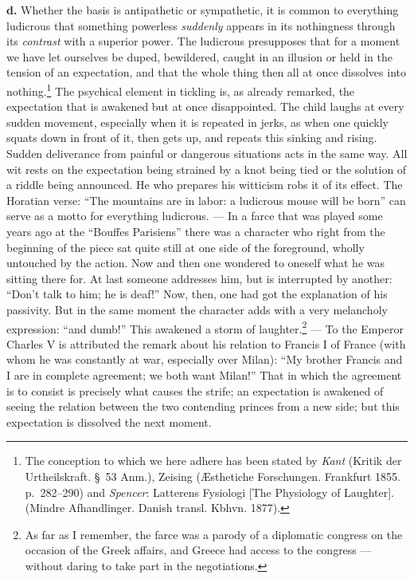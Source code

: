 \documentclass[12pt,a4paper]{book}
\newcommand{\opage}[1]{\marginnote{\footnotesize\textit{[#1]}}}
\begin{document}
\textbf{d.} Whether the basis is antipathetic or sympathetic, it is
common to everything ludicrous that something powerless \emph{suddenly}
appears in its nothingness through its \emph{contrast} with a superior
power. The ludicrous presupposes that for a moment we have let
ourselves be duped, bewildered, caught in an illusion or held in the
tension of an expectation, and that the whole thing then all at
once dissolves into nothing.\footnote{The conception to which we here
adhere has been stated by \emph{Kant} (Kritik der Urtheilskraft. \S~53
Anm.), Zeising (Æsthetiche Forschungen. Frankfurt 1855. p.~282--290) and
\emph{Spencer}: Latterens Fysiologi [The Physiology of Laughter].
(Mindre Afhandlinger. Danish transl. Kbhvn. 1877).} The psychical
element in tickling is, as already remarked, the expectation that is
awakened but at once disappointed. The child laughs at every sudden
movement, especially when it is repeated in jerks, as when one quickly
squats down in front of it, then gets up, and repeats this sinking and
rising. Sudden deliverance from painful or dangerous situations acts in
the same way. All wit rests on the expectation being strained by a knot
being tied or the solution of a riddle being announced. He who prepares
his witticism robs it of its effect. The Horatian verse: ``The mountains
are in labor: a ludicrous mouse will be born'' can serve as a motto for
everything ludicrous. --- In a farce that was played some years ago at
the ``Bouffes Parisiens'' there was a character who right
\opage{350}from the beginning of the piece sat quite still at one side
of the foreground, wholly untouched by the action. Now and then one
wondered to oneself what he was sitting there for. At last someone
addresses him, but is interrupted by another: ``Don't talk to him; he is
deaf!'' Now, then, one had got the explanation of his passivity. But in
the same moment the character adds with a very melancholy expression:
``and dumb!'' This awakened
a storm of laughter.\footnote{As far as I remember, the farce was a
parody of a diplomatic congress on the occasion of the Greek affairs,
and Greece had access to the congress --- without daring to take part
in the negotiations.} --- To the Emperor Charles V is attributed the
remark about his relation to Francis I of France (with whom he was
constantly at war, especially over Milan): ``My brother Francis and I
are in complete agreement; we both want Milan!'' That in which the
agreement is to consist is precisely what causes the strife; an
expectation is awakened of seeing the relation between the two
contending princes from a new side; but this expectation is dissolved
the next moment.
\end{document}
